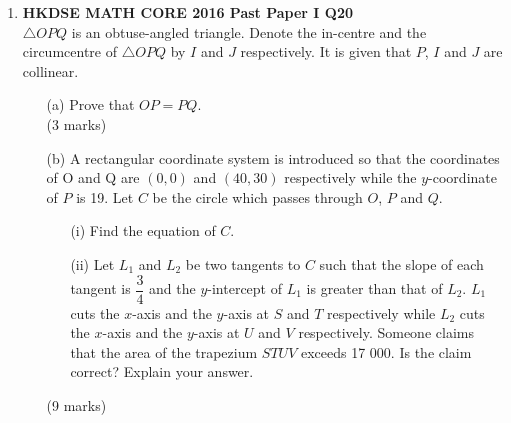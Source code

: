 \documentclass[12pt]{article}
\begin{document}
\begin{enumerate}
	\item \textbf{HKDSE MATH CORE 2016 Past Paper I Q20}\\
	$\triangle OPQ$ is an obtuse-angled triangle. Denote the in-centre and the circumcentre of $\triangle OPQ$ by $I$ and $J$ respectively. It is given that $P$, $I$ and $J$ are collinear.
	\begin{enumerate}
		\item[(a)] Prove that $OP = PQ$. \\(3 marks)
		\item[(b)] A rectangular coordinate system is introduced so that the coordinates of O and Q are $(0, 0)$ and $(40, 30)$ respectively while the $y$-coordinate of $P$ is 19. Let $C$ be the circle which passes through $O$, $P$ and $Q$.
		\begin{enumerate}
			\item[(i)] Find the equation of $C$.
			\item[(ii)] Let $L_1$ and $L_2$ be two tangents to $C$ such that the slope of each tangent is $\dfrac{3}{4}$ and the $y$-intercept of $L_1$ is greater than that of $L_2$. $L_1$ cuts the $x$-axis and the $y$-axis at $S$ and $T$ respectively while $L_2$ cuts the $x$-axis and the $y$-axis at $U$ and $V$ respectively. Someone claims that the area of the trapezium $STUV$ exceeds 17 000. Is the claim correct? Explain your answer.
		\end{enumerate}
		(9  marks)
	\end{enumerate}
\end{enumerate}
\end{document}
